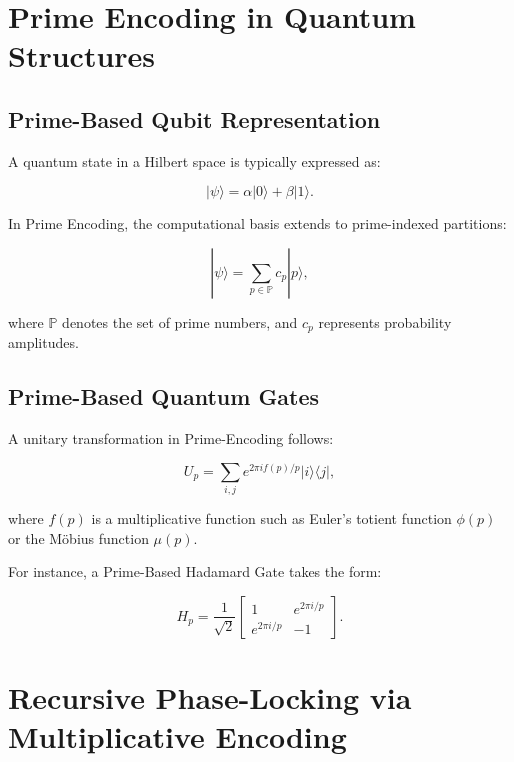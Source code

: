 \documentclass{article}
\theoremstyle{plain}
\begin{document}
\section{Prime Encoding in Quantum Structures}

\subsection{Prime-Based Qubit Representation}
A quantum state in a Hilbert space is typically expressed as:

\begin{equation}
|\psi\rangle = \alpha |0\rangle + \beta |1\rangle.
\end{equation}

In Prime Encoding, the computational basis extends to prime-indexed partitions:

\begin{equation}
|\psi\rangle = \sum_{p \in \mathbb{P}} c_p |p\rangle,
\end{equation}

where \( \mathbb{P} \) denotes the set of prime numbers, and \( c_p \) represents probability amplitudes.

\subsection{Prime-Based Quantum Gates}
A unitary transformation in Prime-Encoding follows:

\begin{equation}
U_p = \sum_{i,j} e^{2\pi i f(p) / p} |i\rangle \langle j|,
\end{equation}

where \( f(p) \) is a multiplicative function such as Euler's totient function \( \phi(p) \) or the Möbius function \( \mu(p) \).

For instance, a Prime-Based Hadamard Gate takes the form:

\begin{equation}
H_p = \frac{1}{\sqrt{2}} \begin{bmatrix}
1 & e^{2\pi i / p} \\
e^{2\pi i / p} & -1
\end{bmatrix}.
\end{equation}

\section{Recursive Phase-Locking via Multiplicative Encoding}
\end{document}
